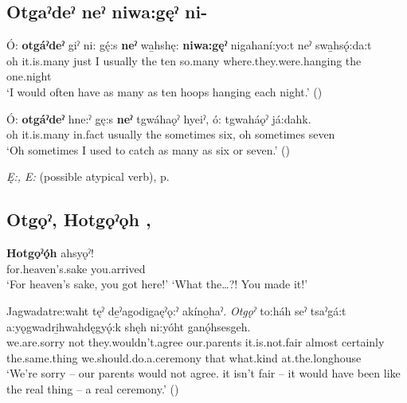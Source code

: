 \subsection*{\textbf{Otgaˀdeˀ neˀ niwa:gęˀ ni-} } \label{p:[otgaˀdeˀ neˀ niwa:gęˀ ni-]}

\ea
\label{ex:opart48}
\gll Ó: \textbf{otgáˀdeˀ} giˀ ni: gę́:s \textbf{neˀ} wa̱hshę: \textbf{niwa:gęˀ} nigahaní:yo:t neˀ swa̱hsǫ́:da:t\\
oh it.is.many just I usually the ten so.many where.they.were.hanging the one.night\\
\glt ‘I would often have as many as ten hoops hanging each night.’ (\cite{mithun_how_1980})
\z

\ea
\label{ex:opart49}
\gll Ó: \textbf{otgáˀdeˀ} hne:ˀ gę:s \textbf{neˀ} tgwáhaǫˀ hyeiˀ, ó: tgwaháǫˀ já:dahk.\\
oh it.is.many in.fact usually the sometimes six, oh sometimes seven\\
\glt ‘Oh sometimes I used to catch as many as six or seven.’ (\cite{mithun_how_1980})
\z

\begin{CayugaRelated}
\item \textit{Ę:, E:} (possible atypical verb), p. \pageref{p:[ę:, e:] `atypical verb’}
\end{CayugaRelated}


\subsection*{\textbf{Otgǫˀ, Hotgǫˀǫh} , } \label{p:[otgǫˀ]}

\ea
\label{ex:opart50}
\gll \textbf{Hotgǫˀǫ́h} ahsyǫˀ!\\
for.heaven’s.sake you.arrived\\
\glt ‘For heaven’s sake, you got here!’ `What the…?! You made it!’
\z

\ea
\label{ex:opart51}
\gll Jagwadatre:waht tęˀ de̱ˀagodigaęˀǫ:ˀ akíno̱haˀ. \textit{Otgǫˀ} to:háh seˀ tsaˀgá:t a:yǫgwadri̱hwahdęgyǫ́:k shęh ni:yóht ganǫ́hsesgeh.\\
we.are.sorry not they.wouldn’t.agree our.parents it.is.not.fair almost certainly the.same.thing we.should.do.a.ceremony that what.kind at.the.longhouse\\
\glt ‘We’re sorry – our parents would not agree. it isn’t fair – it would have been like the real thing -- a real ceremony.’ (\cite{carrier_legends_2013})
\z



